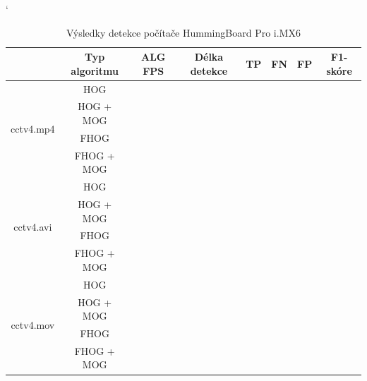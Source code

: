 \begin{table}[H]
\catcode`
\centering
\caption{Výsledky detekce počítače HummingBoard Pro i.MX6 }
\label{resultTabIMX}
\begin{tabular}{|c|c|c|c|c|c|c|c|}
\hline
                         & Typ algoritmu   	& ALG FPS & Délka detekce & TP & FN & FP & F1-skóre \\ \hline
\multirow{4}{*}{cctv4.mp4} & HOG        	&         &               &    &    &    &          \\ \cline{2-8} 
                         & HOG + MOG  		&         &               &    &    &    &          \\ \cline{2-8} 
                         & FHOG       		&         &               &    &    &    &          \\ \cline{2-8} 
                         & FHOG + MOG 		&         &               &    &    &    &          \\ \hline\hline 
\multirow{4}{*}{cctv4.avi} & HOG        	&         &               &    &    &    &          \\ \cline{2-8} 
                         & HOG + MOG  		&         &               &    &    &    &          \\ \cline{2-8} 
                         & FHOG       		&         &               &    &    &    &          \\ \cline{2-8} 
                         & FHOG + MOG 		&         &               &    &    &    &          \\ \hline \hline
\multirow{4}{*}{cctv4.mov} & HOG        	&         &               &    &    &    &          \\ \cline{2-8} 
                         & HOG + MOG  		&         &               &    &    &    &          \\ \cline{2-8} 
                         & FHOG       		&         &               &    &    &    &          \\ \cline{2-8} 
                         & FHOG + MOG 		&         &               &    &    &    &          \\ \hline
\end{tabular}
\end{table}



